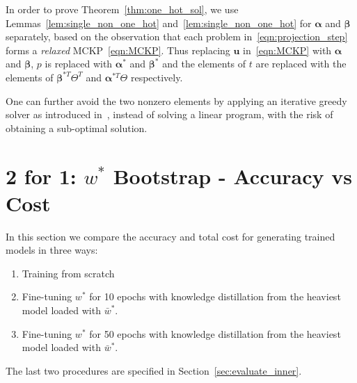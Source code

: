 \documentclass[dvipsnames,table,xcdraw]{article}
\newenvironment{remark}[1][Remark]{\begin{trivlist}
\item[\hskip \labelsep {\bfseries #1}]}{\end{trivlist}}
\newcommand{\mb}[1]{{\boldsymbol{#1}}}
\newcommand{\vu}{\mb{u}}
\newcommand{\balpha}{\bm{\alpha}}
\newcommand{\bbeta}{\bm{\beta}}
\begin{document}
\vspace{-3mm}
In order to prove Theorem~\ref{thm:one_hot_sol}, we use Lemmas~\ref{lem:single_non_one_hot} and~\ref{lem:single_non_one_hot} for $\balpha$ and $\bbeta$ separately, based on the observation that  each problem in~\eqref{eqn:projection_step} forms a \textit{relaxed} MCKP~\eqref{eqn:MCKP}. Thus replacing $\vu$ in~\eqref{eqn:MCKP} with $\balpha$ and $\bbeta$, $p$ is replaced with $\balpha^*$ and $\bbeta^*$ and the elements of \textbf{$t$} are replaced with the elements of $\bbeta^{*T}\Theta^T$ and $\balpha^{*T}\Theta$ respectively.

\vspace{-1.5mm}
\begin{remark}
One can further avoid the two nonzero elements by applying an iterative greedy solver as introduced in~\cite{MCKP}, instead of solving a linear program, with the risk of obtaining a sub-optimal solution.
\end{remark} 

\vspace{-4mm}
\section{2 for 1: $w^*$ Bootstrap - Accuracy vs Cost}
\vspace{-1mm}
In this section we compare the accuracy and total cost for generating trained models in three ways:
\begin{enumerate}
    \vspace{-2mm}
    \item Training from scratch
    \vspace{-2mm}
    \item Fine-tuning $w^*$ for 10 epochs with knowledge distillation from the heaviest model loaded with $\bar{w}^*$.
    \vspace{-2mm}
    \item Fine-tuning $w^*$ for 50 epochs with knowledge distillation from the heaviest model loaded with $\bar{w}^*$.
\end{enumerate}
The last two procedures are specified in Section~\ref{sec:evaluate_inner}.
\end{document}
